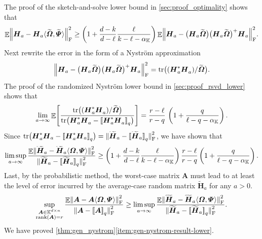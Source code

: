 \documentclass[11pt]{article}
\newcommand{\field}{\mathbb{K}}
\DeclareMathOperator{\tr}{tr}
\DeclareMathOperator{\rank}{rank}
\newcommand{\mat}[1]{\boldsymbol{#1}}
\newcommand{\lowrank}[1]{%
  \mleft[\!\mleft[ #1 \mright]\!\mright]}
\newcommand{\norm}[1]{\mleft\| #1 \mright\|}
\DeclareMathOperator{\expect}{\mathbb{E}}
\renewcommand{\tilde}[1]{\widetilde{#1}}
\theoremstyle{definition}
\numberwithin{equation}{section}
\begin{document}
The proof of the sketch-and-solve lower bound in \cref{sec:proof_optimality} shows that
\begin{equation*}
    \expect \norm{\mat{H}_a
    - \mat{H}_a\langle \tilde{\mat{\varOmega}}, \tilde{\mat{\varPsi}} \rangle}_{\rm F}^2
    \geq \left(1 + \frac{d-k}{d-\ell} \frac{\ell}{k - \ell - \alpha_\field} \right) \expect \norm{\mat{H}_a
    - \bigl(\mat{H}_a \tilde{\mat{\varOmega}}\bigr)
    \bigl(\mat{H}_a \tilde{\mat{\varOmega}}\bigr)^+ \mat{H}_a }_{\rm F}^2.
\end{equation*}
Next rewrite the error in the form of a Nystr\"om approximation
\begin{equation*}
    \norm{\mat{H}_a
    - \bigl(\mat{H}_a \tilde{\mat{\varOmega}}\bigr)
    \bigl(\mat{H}_a \tilde{\mat{\varOmega}}\bigr)^+ \mat{H}_a }_{\rm F}^2
    = \tr\bigl((\mat{H}_a^* \mat{H}_a^{\vphantom{*}}) / \tilde{\mat{\varOmega}}\bigr).
\end{equation*}
The proof of the randomized Nystr\"om lower bound in \cref{sec:proof_rsvd_lower} shows that
\begin{equation*}
    \lim_{a \rightarrow \infty} \expect\Biggl[ \frac{\tr\bigl((\mat{H}_a^* \mat{H}_a^{\vphantom{*}}) / \tilde{\mat{\varOmega}}\bigr)}{\tr\bigl(\mat{H}_a^* \mat{H}_a^{\vphantom{*}} - \lowrank{\smash{\mat{H}_a^* \mat{H}_a^{\vphantom{*}}}}_q\bigr)}\Biggr] = \frac{r-\ell}{r-q}\, \left(1 + \frac{q}{\ell - q - \alpha_\field}\right).
\end{equation*}
Since $\tr\bigl(\mat{H}_a^* \mat{H}_a - \lowrank{\smash{\mat{H}_a^* \mat{H}_a}}_q\bigr) = \norm{\smash{\tilde{\mat{H}}_a - \lowrank{\smash{\tilde{\mat{H}}_a}}_q}}_{\rm F}^2$, we have shown that
\begin{equation*}
    \limsup_{a \rightarrow \infty} 
    \frac{\expect \norm{\smash{\tilde{\mat{H}}_a
    - \tilde{\mat{H}}_a\langle \mat{\varOmega}, \mat{\varPsi} \rangle}}_{\rm F}^2}
    {\norm{\smash{\tilde{\mat{H}}_a - \lowrank{\smash{\tilde{\mat{H}}_a}}_q}}_{\rm F}^2}
    \geq \left(1 + \frac{d-k}{d-\ell} \frac{\ell}{k - \ell - \alpha_\field} \right)
    \frac{r-\ell}{r-q} \left( 1 + \frac{q}{\ell-q-\alpha_\field} \right).
\end{equation*}
Last, by the probabilistic method, the worst-case matrix $\mat{A}$ must lead to at least the level of error incurred by the average-case random matrix $\tilde{\mat{H}}_a$ for any $a > 0$.
\begin{equation*}
    \sup_{\substack{\mat{A} \in \field^{d\times n} \\ \rank(\mat{A}) = r}} 
    \frac{\expect \norm{\smash{\mat{A} - \mat{A}\langle\mat{\varOmega},\mat{\varPsi}\rangle}}_{\rm F}^2}
    {\norm{\smash{\mat{A} - \lowrank{\mat{A}}_q}}_{\rm F}^2} 
    \geq \limsup_{a \rightarrow \infty} \frac{\expect \norm{\smash{\tilde{\mat{H}}_a
    - \tilde{\mat{H}}_a\langle \mat{\varOmega}, \mat{\varPsi} \rangle}}_{\rm F}^2}
    {\norm{\smash{\tilde{\mat{H}}_a - \lowrank{\smash{\tilde{\mat{H}}_a}}_q}}_{\rm F}^2}.
\end{equation*}
We have proved \cref{thm:gen_nystrom}\ref{item:gen-nystrom-result-lower}.
\end{document}
